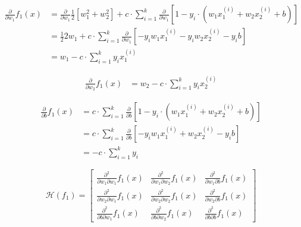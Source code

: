 \documentclass[12pt,landscape]{article}
\begin{document}
\begin{align}
\frac{\partial}{\partial w_1} f_1(x) &= \frac{\partial}{\partial w_1}\frac{1}{2} \left[ w_1^2 + w_2^2 \right] + c \cdot \sum\limits_{i=1}^k  \frac{\partial}{\partial w_1} \left[ 1-y_i \cdot \left( w_1  x_1^{(i)} +  w_2  x_2^{(i)} + b \right) \right]\nonumber\\
&= \frac{1}{2} 2w_1 + c \cdot \sum\limits_{i=1}^k  \frac{\partial}{\partial w_1} \left[ -y_i w_1  x_1^{(i)} -y_i  w_2  x_2^{(i)}  -y_ib \right]\nonumber\\
&= w_1 - c \cdot \sum\limits_{i=1}^k y_i  x_1^{(i)}
\end{align}

\newcommand{\lOneLossDwOne}{w_1 - c \cdot \sum\limits_{i=1}^k y_i  x_1^{(i)}}

\begin{align}
\frac{\partial}{\partial w_2} f_1(x) &= w_2  - c \cdot \sum\limits_{i=1}^k y_i  x_2^{(i)} 
\end{align}

\newcommand{\lOneLossDwTwo}{w_2  - c \cdot \sum\limits_{i=1}^k y_i  x_2^{(i)} }

\begin{align}
\frac{\partial}{\partial b} f_1(x) &= c \cdot \sum\limits_{i=1}^k  \frac{\partial}{\partial b} \left[ 1-y_i \cdot \left( w_1  x_1^{(i)} + w_2  x_2^{(i)} + b \right) \right]\nonumber\\
&= c \cdot \sum\limits_{i=1}^k  \frac{\partial}{\partial b} \left[ -y_i w_1  x_1^{(i)} +  w_2  x_2^{(i)} -y_ib \right]\nonumber\\
&= - c \cdot \sum\limits_{i=1}^k y_i
\end{align}


\begin{equation}
\mathcal{H}(f_1) = \begin{bmatrix}
\frac{\partial^2}{\partial w_1 \partial w_1} f_1(x) & \frac{\partial^2}{\partial w_1 \partial w_2} f_1(x) & \frac{\partial^2}{\partial w_1 \partial b} f_1(x)\\
\frac{\partial^2}{\partial w_2 \partial w_1} f_1(x) & \frac{\partial^2}{\partial w_2 \partial w_2} f_1(x) & \frac{\partial^2}{\partial w_2 \partial b}f_1(x)\\
\frac{\partial^2}{\partial b \partial w_1}f_1(x) & \frac{\partial^2}{\partial b \partial w_2} f_1(x) & \frac{\partial^2}{\partial b \partial b}f_1(x)
\end{bmatrix}
\end{equation}
\end{document}
